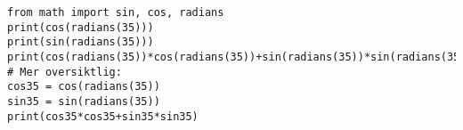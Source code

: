 %
%
\begin {lstlisting}
from math import sin, cos, radians
print(cos(radians(35)))
print(sin(radians(35)))
print(cos(radians(35))*cos(radians(35))+sin(radians(35))*sin(radians(35)))
# Mer oversiktlig:
cos35 = cos(radians(35))
sin35 = sin(radians(35))
print(cos35*cos35+sin35*sin35)
\end{lstlisting}
